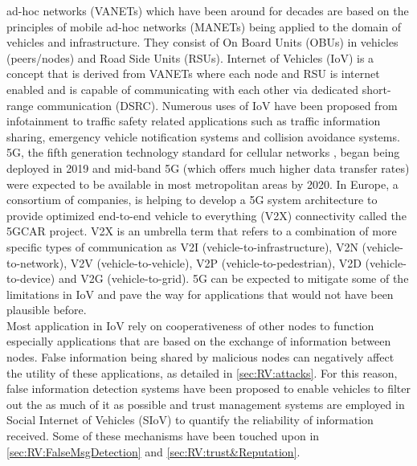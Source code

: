 \documentclass[journal]{IEEEtran}
\begin{document}
% 
% 
% 
% 
 ad-hoc networks (VANETs) which have been around for decades are based on the principles of mobile ad-hoc networks (MANETs) being applied to the domain of vehicles and infrastructure. They consist of On Board Units (OBUs) in vehicles (peers/nodes) and Road Side Units (RSUs). Internet of Vehicles (IoV) is a concept that is derived from VANETs where each node and RSU is internet enabled and is capable of communicating with each other via dedicated short-range communication (DSRC). Numerous uses of IoV have been proposed from infotainment to traffic safety related applications such as traffic information sharing, emergency vehicle notification systems and collision avoidance systems.
\\5G, the fifth generation technology standard for cellular networks \cite{c:INTERNET_5garticle}, began being deployed in 2019 and mid-band 5G (which offers much higher data transfer rates) were expected to be available in most metropolitan areas by 2020. In Europe, a consortium of companies, is helping to develop a 5G system architecture to provide optimized end-to-end vehicle to everything (V2X) connectivity called the 5GCAR project.
V2X is an umbrella term that refers to a combination of more specific types of communication as V2I (vehicle-to-infrastructure), V2N (vehicle-to-network), V2V (vehicle-to-vehicle), V2P (vehicle-to-pedestrian), V2D (vehicle-to-device) and V2G (vehicle-to-grid). 5G can be expected to mitigate some of the limitations in IoV and pave the way for applications that would not have been plausible before.
\\Most application in IoV rely on cooperativeness of other nodes to function especially applications that are based on the exchange of information between nodes. False information being shared by malicious nodes can negatively affect the utility of these applications, as detailed in \ref{sec:RV:attacks}. For this reason, false information detection systems have been proposed to enable vehicles to filter out the as much of it as possible and trust management systems are employed in Social Internet of Vehicles (SIoV) to quantify the reliability of information received. Some of these mechanisms have been touched upon in \ref{sec:RV:FalseMsgDetection} and \ref{sec:RV:trust&Reputation}.
\end{document}
